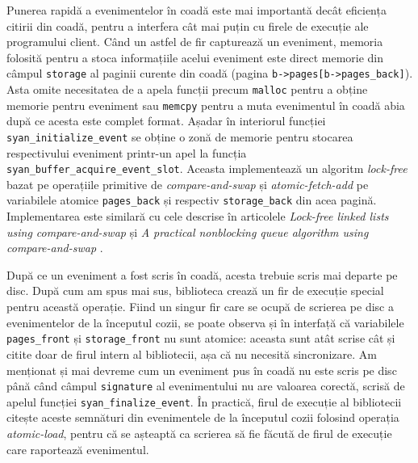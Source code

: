 Punerea rapidă a evenimentelor în coadă este mai importantă decât
eficiența citirii din coadă, pentru a interfera cât mai puțin cu firele
de execuție ale programului client. Când un astfel de fir capturează un
eveniment, memoria folosită pentru a stoca informațiile acelui eveniment
este direct memorie din câmpul \lstinline{storage} al paginii curente
din coadă (pagina \lstinline{b->pages[b->pages_back]}). Asta omite
necesitatea de a apela funcții precum \lstinline{malloc} pentru a obține
memorie pentru eveniment sau \lstinline{memcpy} pentru a muta
evenimentul în coadă abia după ce acesta este complet format. Așadar în
interiorul funcției \lstinline{syan_initialize_event} se obține o zonă
de memorie pentru stocarea respectivului eveniment printr-un apel la
funcția \lstinline{syan_buffer_acquire_event_slot}. Aceasta
implementează un algoritm \textit{lock-free} bazat pe operațiile
primitive de \textit{compare-and-swap} și \textit{atomic-fetch-add} pe
variabilele atomice \lstinline{pages_back} și respectiv
\lstinline{storage_back} din acea pagină. Implementarea este similară cu
cele descrise în articolele
\textit{Lock-free linked lists using compare-and-swap}
\cite{LinkedListsCAS} și
\textit{A practical nonblocking queue algorithm using compare-and-swap}
\cite{QueueCAS}.

După ce un eveniment a fost scris în coadă, acesta trebuie scris mai
departe pe disc. După cum am spus mai sus, biblioteca crează un fir de
execuție special pentru această operație. Fiind un singur fir care se
ocupă de scrierea pe disc a evenimentelor de la începutul cozii, se
poate observa și în interfață că variabilele \lstinline{pages_front} și
\lstinline{storage_front} nu sunt atomice: aceasta sunt atât scrise cât
și citite doar de firul intern al bibliotecii, așa că nu necesită
sincronizare. Am menționat și mai devreme cum un eveniment pus în coadă
nu este scris pe disc până când câmpul \lstinline{signature} al
evenimentului nu are valoarea corectă, scrisă de apelul funcției
\lstinline{syan_finalize_event}. În practică, firul de execuție al
bibliotecii citește aceste semnături din evenimentele de la începutul
cozii folosind operația \textit{atomic-load}, pentru că se așteaptă ca
scrierea să fie făcută de firul de execuție care raportează evenimentul.

